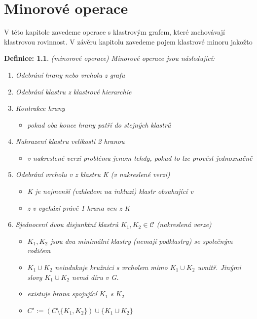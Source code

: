 \documentclass[12pt,a4report]{report}
\newtheorem{defn}{Definice: }[chapter]
\begin{document}
\author{Filip Šedivý}

\chapter{Minorové operace}

V této kapitole zavedeme operace s klastrovým grafem, které zachovávají klastrovou rovinnost. V závěru kapitolu zavedeme pojem klastrové minoru jakožto

\begin{defn} (minorové operace)
Minorové operace jsou následující:
\begin{enumerate}
\item Odebrání hrany nebo vrcholu z grafu
\item Odebrání klastru z klastrové hierarchie
\item Kontrakce hrany
\begin{itemize}
\item  pokud oba konce hrany patří do stejných klastrů
\end{itemize}
\item Nahrazení klastru velikosti 2 hranou
\begin{itemize}
\item  v nakreslené verzi problému jenom tehdy, pokud to lze provést jednoznačně
\end{itemize}
\item Odebrání vrcholu v z klastru K (v nakreslené verzi)
\begin{itemize}
\item  K je nejmenší (vzhledem na inkluzi) klastr obsahující v
\item z v vychází právě 1 hrana ven z K 
\end{itemize}
\item Sjednocení dvou disjunktní klastrů $K_1, K_2 \in \mathcal C$  (nakreslená verze)
\begin{itemize}
\item $K_1, K_2$ jsou dva minimální klastry (nemají podklastry) se společným rodičem
\item $K_1 \cup K_2$ neindukuje kružnici s vrcholem mimo $K_1 \cup K_2$ uvnitř. Jinými slovy $K_1 \cup K_2$ nemá díru v G.
\item existuje hrana spojující $K_1$ s $K_2$
\item $C'  := (C\setminus \{K_1,K_2\}) \cup \{K_1 \cup K_2\}$
\end{itemize}
\end{enumerate}
\end{defn}
\end{document}

